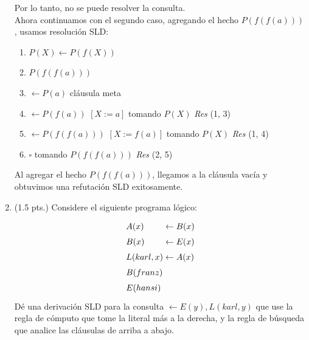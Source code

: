 \documentclass[12pt,letterpaper]{article}
\newcommand{\dmp}{\leftarrow}
\begin{document}
\begin{enumerate}
  Por lo tanto, no se puede resolver la consulta.\\

  Ahora continuamos con el segundo caso, agregando el hecho $P(f(f(a)))$, usamos resolución SLD:
  \begin{center}
    \begin{enumerate}[label=\arabic*.]
    \item \( P(X) \dmp P(f(X)) \)
    \item \( P(f(f(a))) \)
    \item \( \dmp P(a) \)    \hspace{7.35cm} cl\'{a}usula meta
    \item \( \dmp P(f(a)) \) \hspace{1.06cm} $[X := a]$ \hspace{1.16cm} tomando $P(X)$ \hspace{0.5cm} \textit{Res} (1, 3)
    \item \( \dmp P(f(f(a))) \) \hspace{0.49cm} $[X := f(a)]$ \hspace{0.59cm} tomando $P(X)$ \hspace{0.5cm} \textit{Res} (1, 4)
    \item \( \square \)  \hspace{4.66cm} tomando $P(f(f(a)))$ \hspace{0.5cm} \textit{Res} (2, 5)
    \end{enumerate}
  \end{center}

  Al agregar el hecho $P(f(f(a)))$, llegamos a la cl\'{a}usula vac\'{i}a y obtuvimos una refutaci\'{o}n SLD exitosamente.

  \newpage
  
\item (1.5 pts.) Considere el siguiente programa lógico:
  \[\arraycolsep=1.4pt\def\arraystretch{1.5}
  \begin{array}{lcl}
    A(x) &\leftarrow& B(x)\\
    B(x) &\leftarrow& E(x)\\
    L(karl,x) &\leftarrow& A(x)\\
    B(franz)&&\\
    E(hansi)&&
  \end{array}
  \]
  Dé una derivación SLD para la consulta $\leftarrow E(y), L(karl,y)$ que use la regla de cómputo que tome la literal más a la derecha, y la regla de búsqueda que analice las cláusulas de arriba a abajo.


\end{enumerate}
\end{document}
